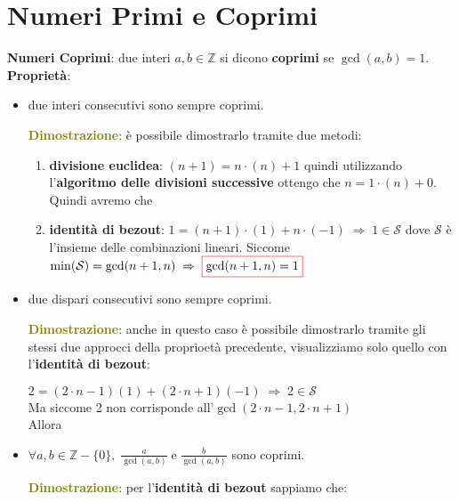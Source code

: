 \section{Numeri Primi e Coprimi}
\textbf{Numeri Coprimi}: due interi $a, b \in \mathbb{Z}$ si dicono \textbf{coprimi} se $\gcd (a, b) = 1$. \\
\textbf{Proprietà}:
\begin{itemize}[nosep]
    \item due interi consecutivi sono sempre coprimi.
    \begin{boxA}
        \textcolor{olive}{\textbf{Dimostrazione}}: è possibile dimostrarlo tramite due metodi:
        \begin{enumerate}[nosep]
            \item \textbf{divisione euclidea}: $(n + 1) = n \cdot (n) + 1$ quindi utilizzando l'\textbf{algoritmo delle divisioni successive} ottengo che $n = 1 \cdot (n) + 0$. Quindi avremo che 
            \item \textbf{identità di bezout}: $1 = (n + 1) \cdot (1) + n \cdot (-1) \; \Rightarrow \; 1 \in \mathcal{S}$ dove $\mathcal{S}$ è l'insieme delle combinazioni lineari. Siccome $\min (\mathcal{S}) = \gcd (n + 1, n) \; \Rightarrow \; \fcolorbox{red}{white}{$\gcd (n + 1, n) = 1$}$
        \end{enumerate}
    \end{boxA}
    \newpage
    \item due dispari consecutivi sono sempre coprimi.
    \begin{boxA}
        \textcolor{olive}{\textbf{Dimostrazione}}: anche in questo caso è possibile dimostrarlo tramite gli stessi due approcci della proprioetà precedente, visualizziamo solo quello con l'\textbf{identità di bezout}:
        
        {\centering
            $2 = (2 \cdot n - 1) (1) + (2 \cdot n + 1) (-1) \; \Rightarrow \; 2 \in \mathcal{S}$ \\
            Ma siccome 2 non corrisponde all'$\gcd (2 \cdot n - 1, 2 \cdot n + 1)$ \\
            Allora 
        \par}
    \end{boxA}
    \item $\forall a, b \in \mathbb{Z} - \{0\}, \; \frac{a}{\gcd (a, b)} \; \text{e} \; \frac{b}{\gcd (a, b)}$ sono coprimi.
    \begin{boxA}
        \textcolor{olive}{\textbf{Dimostrazione}}: per l'\textbf{identità di bezout} sappiamo che:
    

\end{boxA}
\end{itemize}
